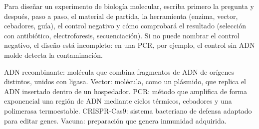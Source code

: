 \documentclass{book}
\begin{document}

\begin{tcolorbox}[title={Consejo}, studiumtip, breakable]

Para diseñar un experimento de biología molecular, escriba primero la pregunta y después, paso a paso, el material de partida, la herramienta (enzima, vector, cebadores, guía), el control negativo y cómo comprobará el resultado (selección con antibiótico, electroforesis, secuenciación). Si no puede nombrar el control negativo, el diseño está incompleto: en una PCR, por ejemplo, el control sin ADN molde detecta la contaminación.

\end{tcolorbox}

\begin{tcolorbox}[title={Definición}, studiumdef, breakable]

ADN recombinante: molécula que combina fragmentos de ADN de orígenes distintos, unidos con ligasa. Vector: molécula, como un plásmido, que replica el ADN insertado dentro de un hospedador. PCR: método que amplifica de forma exponencial una región de ADN mediante ciclos térmicos, cebadores y una polimerasa termoestable. CRISPR-Cas9: sistema bacteriano de defensa adaptado para editar genes. Vacuna: preparación que genera inmunidad adquirida.

\end{tcolorbox}
\end{document}
